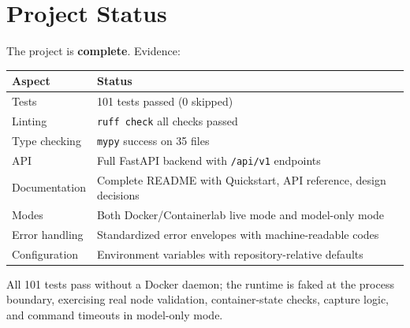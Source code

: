 \documentclass[11pt,a4paper]{article}
\begin{document}
\section{Project Status}
The project is \textbf{complete}. Evidence:

\begin{tabularx}{\linewidth}{@{} l X @{}}
  \toprule
  \textbf{Aspect} & \textbf{Status} \\
  \midrule
  Tests & 101 tests passed (0 skipped) \\
  Linting & \texttt{ruff check} all checks passed \\
  Type checking & \texttt{mypy} success on 35 files \\
  API & Full FastAPI backend with \texttt{/api/v1} endpoints \\
  Documentation & Complete README with Quickstart, API reference, design decisions \\
  Modes & Both Docker/Containerlab live mode and model-only mode \\
  Error handling & Standardized error envelopes with machine-readable codes \\
  Configuration & Environment variables with repository-relative defaults \\
  \bottomrule
\end{tabularx}

All 101 tests pass without a Docker daemon; the runtime is faked at the process
boundary, exercising real node validation, container-state checks, capture logic, and
command timeouts in model-only mode.
\end{document}
